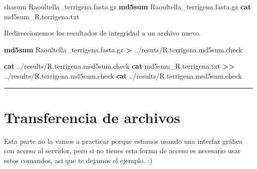 \documentclass[
]{book}
\newenvironment{Shaded}{\begin{snugshade}}{\end{snugshade}}
\newcommand{\ExtensionTok}[1]{#1}
\newcommand{\FunctionTok}[1]{\textcolor[rgb]{0.13,0.29,0.53}{\textbf{#1}}}
\newcommand{\NormalTok}[1]{#1}
\newcommand{\OperatorTok}[1]{\textcolor[rgb]{0.81,0.36,0.00}{\textbf{#1}}}
\begin{document}
\begin{Shaded}
\begin{Highlighting}[]
\ExtensionTok{shasum}\NormalTok{ Raoultella\_terrigena.fasta.gz}
\FunctionTok{md5sum}\NormalTok{ Raoultella\_terrigena.fasta.gz}
\FunctionTok{cat}\NormalTok{ md5sum\_R.terrigena.txt}
\end{Highlighting}
\end{Shaded}

Redireccionemos los resultados de integridad a un archivo nuevo.

\begin{Shaded}
\begin{Highlighting}[]
\FunctionTok{md5sum}\NormalTok{ Raoultella\_terrigena.fasta.gz }\OperatorTok{\textgreater{}}
\ExtensionTok{../resuts/R.terrigena.md5sum.check}

\FunctionTok{cat}\NormalTok{ ../results/R.terrigena.msd5sum.check}
\FunctionTok{cat}\NormalTok{ md5sum\_R.terrigena.txt }\OperatorTok{\textgreater{}\textgreater{}}\NormalTok{ ../results/R.terrigena.md5sum.check}
\FunctionTok{cat}\NormalTok{ ../results/R.terrigena.msd5sum.check}
\end{Highlighting}
\end{Shaded}

\begin{center}\rule{0.5\linewidth}{0.5pt}\end{center}

\section{Transferencia de archivos}\label{transferencia-de-archivos}

Esta parte no la vamos a practicar porque estamos usando una interfaz gráfica con acceso al servidor, pero si no tienes esta forma de acceso es necesario usar estos comandos, asi que te dejamos el ejemplo. :)
\end{document}
